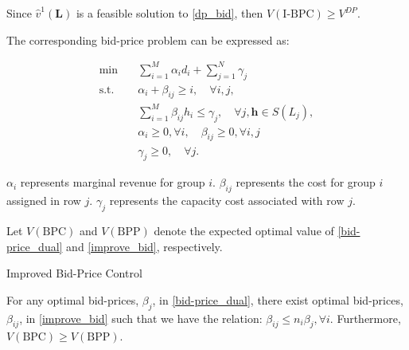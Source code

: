 Since $\hat{v}^{1}(\bm{L})$ is a feasible solution to \eqref{dp_bid}, then $V(\text{I-BPC}) \geq V^{DP}$.

The corresponding bid-price problem can be expressed as:

\begin{equation}\label{improve_bid}
    \begin{aligned}
    \min \quad & \sum_{i=1}^M \alpha_i d_i+ \sum_{j=1}^N \gamma_j \\
    \mathrm{s.t.} \quad & \alpha_i+\beta_{i j} \geq i, \quad \forall i, j, \\
    & \sum_{i=1}^M \beta_{i j} h_i \leq \gamma_j, \quad \forall j, \bm{h} \in S(L_j), \\
    & \alpha_i \geq 0, \forall i, \quad \beta_{ij} \geq 0, \forall i, j \\
    & \gamma_j \geq 0, \quad \forall j.
    \end{aligned}
\end{equation}

$\alpha_{i}$ represents marginal revenue for group $i$. $\beta_{ij}$ represents the cost for group $i$ assigned in row $j$. $\gamma_{j}$ represents the capacity cost associated with row $j$.

Let $V(\text{BPC})$ and $V(\text{BPP})$ denote the expected optimal value of \eqref{bid-price_dual} and \eqref{improve_bid}, respectively.


\begin{algorithm}[H]
    \caption{Improved Bid-Price Control}\label{algo_improve_bid}
\end{algorithm}

\begin{lem}\label{BPC_relation}
    For any optimal bid-prices, $\beta_{j}$, in \eqref{bid-price_dual}, there exist optimal bid-prices, $\beta_{ij}$, in \eqref{improve_bid} such that we have the relation:
    $\beta_{ij} \leq n_{i} \beta_{j}, \forall i$. Furthermore, $V(\text{BPC}) \geq V(\text{BPP})$.
\end{lem}
    
    
    
